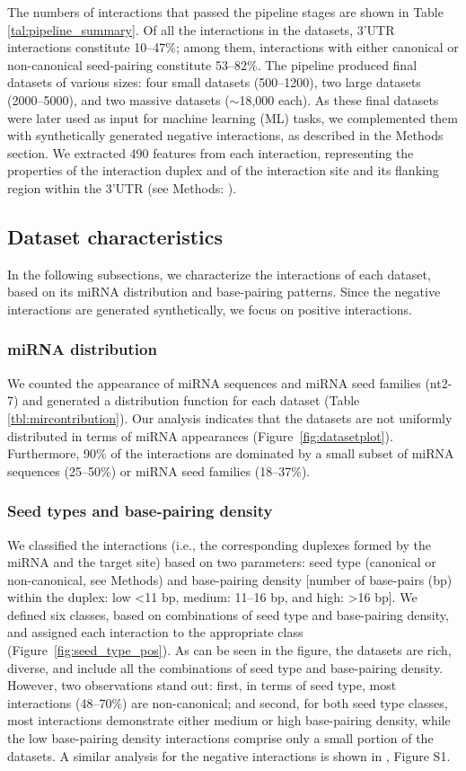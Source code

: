 \documentclass{bmcart}
\begin{document}
The numbers of interactions that passed the pipeline stages are shown in Table \ref{tal:pipeline_summary}. Of all the interactions in the datasets, 3'UTR interactions constitute 10--47\%; among them, interactions with either canonical or non-canonical seed-pairing constitute 53--82\%. The pipeline produced final datasets of various sizes: four small datasets (500--1200), two large datasets (2000--5000), and two massive datasets ($\sim$18,000 each). As these final datasets were later used as input for machine learning (ML) tasks, we complemented them with synthetically generated negative interactions, as described in the Methods section. We extracted 490 features from each interaction, representing the properties of the interaction duplex and of the interaction site and its flanking region within the 3'UTR (see Methods: ).


\subsection*{Dataset characteristics}
In the following subsections, we characterize the interactions of each dataset, based on its miRNA distribution and base-pairing patterns. Since the negative interactions are generated synthetically, we focus on positive interactions.

\subsubsection*{miRNA distribution}
We counted the appearance of miRNA sequences and miRNA seed families (nt2-7) and generated a distribution function for each dataset (Table \ref{tbl:mircontribution}). Our analysis indicates that the datasets are not uniformly distributed in terms of miRNA appearances (Figure~\ref{fig:datasetplot}). Furthermore, 90\% of the interactions are dominated by a small subset of miRNA sequences (25--50\%) or miRNA seed families (18--37\%).


\subsubsection*{Seed types and base-pairing density}
We classified the interactions (i.e., the corresponding duplexes formed by the miRNA and the target site) based on two parameters: seed type (canonical or non-canonical, see Methods) and base-pairing density [number of base-pairs (bp) within the duplex: low \textless 11 bp, medium: 11--16 bp, and high: \textgreater 16 bp]. We defined six classes, based on combinations of seed type and base-pairing density, and assigned each interaction to the appropriate class (Figure~\ref{fig:seed_type_pos}). As can be seen in the figure, the datasets are rich, diverse, and include all the combinations of seed type and base-pairing density.
However, two observations stand out: 
first, in terms of seed type, most interactions (48--70\%) are non-canonical; and second, for both seed type classes, most interactions demonstrate either medium or high base-pairing density, while the low base-pairing density interactions comprise only a small portion of the datasets. A similar analysis for the negative interactions is shown in , Figure S1.
\end{document}
